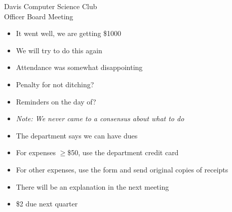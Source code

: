 \documentclass{article}
\begin{document}
\begin{Minutes}{Davis Computer Science Club\\Officer Board Meeting}
\missingExcused{}




\maketitle
{}
\begin{itemize}
\item It went well, we are getting \$1000
\item We will try to do this again
\item Attendance was somewhat disappointing
\end{itemize}
\begin{itemize}
\item Penalty for not ditching?
\item Reminders on the day of?
\item \textit{Note: We never came to a consensus about what to do}
\end{itemize}

\begin{itemize}
\item The department says we can have dues
\item For expenses $\ge$\$50, use the department credit card
\item For other expenses, use the form and send original copies of receipts
\item There will be an explanation in the next meeting
\item \$2 due next quarter
\end{itemize}


\end{Minutes}
\end{document}
